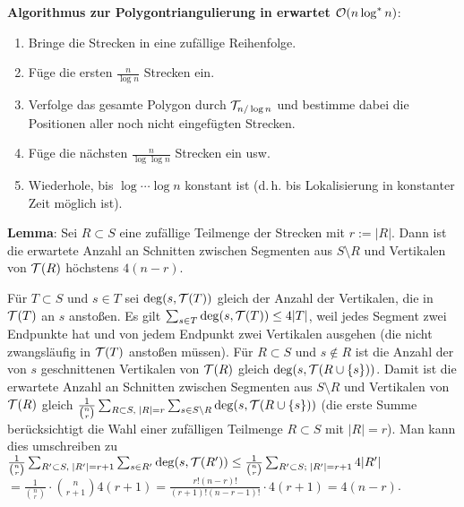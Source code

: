 \linie
\pagebreak

\textbf{Algorithmus zur Polygontriangulierung in erwartet $\mathcal{O}(n \log^\ast n)$}:
\begin{enumerate}
    \item
    Bringe die Strecken in eine zufällige Reihenfolge.
    
    \item
    Füge die ersten $\frac{n}{\log n}$ Strecken ein.
    
    \item
    Verfolge das gesamte Polygon durch $\mathcal{T}_{n/\log n}$ und bestimme dabei die Positionen
    aller noch nicht eingefügten Strecken.
    
    \item
    Füge die nächsten $\frac{n}{\log \log n}$ Strecken ein usw.
    
    \item
    Wiederhole, bis $\log \dotsb \log n$ konstant ist
    (d.\,h. bis Lokalisierung in konstanter Zeit möglich ist).
\end{enumerate}

\linie

\textbf{Lemma}:
Sei $R \subset S$ eine zufällige Teilmenge der Strecken mit $r := |R|$.
Dann ist die erwartete Anzahl an Schnitten zwischen Segmenten aus $S \setminus R$ und
Vertikalen von $\mathcal{T}(R)$ höchstens $4(n-r)$.

\begin{Beweis}
    Für $T \subset S$ und $s \in T$ sei $\deg(s, \mathcal{T}(T))$
    gleich der Anzahl der Vertikalen, die in $\mathcal{T}(T)$ an $s$ anstoßen.
    Es gilt $\sum_{s \in T} \deg(s, \mathcal{T}(T)) \le 4|T|$, weil
    jedes Segment zwei Endpunkte hat und von jedem Endpunkt zwei Vertikalen ausgehen
    (die nicht zwangsläufig in $\mathcal{T}(T)$ anstoßen müssen).
    Für $R \subset S$ und $s \notin R$ ist die Anzahl der von $s$ geschnittenen
    Vertikalen von $\mathcal{T}(R)$ gleich $\deg(s, \mathcal{T}(R \cup \{s\}))$.
    Damit ist die erwartete Anzahl an Schnitten zwischen Segmenten aus $S \setminus R$ und
    Vertikalen von $\mathcal{T}(R)$ gleich
    $\frac{1}{\binom{n}{r}} \sum_{R \subset S,\; |R| = r}
    \sum_{s \in S \setminus R} \deg(s, \mathcal{T}(R \cup \{s\}))$
    (die erste Summe berücksichtigt die Wahl einer zufälligen Teilmenge $R \subset S$
    mit $|R| = r$).
    Man kann dies umschreiben zu
    $\frac{1}{\binom{n}{r}} \sum_{R' \subset S,\; |R'| = r+1} \sum_{s \in R'} \deg(s, \mathcal{T}(R'))
    \le \frac{1}{\binom{n}{r}} \sum_{R' \subset S;\; |R'| = r+1} 4|R'|$\\
    $= \frac{1}{\binom{n}{r}} \cdot \binom{n}{r+1} 4(r+1)
    = \frac{r!(n-r)!}{(r+1)!(n-r-1)!} \cdot 4(r+1)
    = 4(n-r)$.
\end{Beweis}

